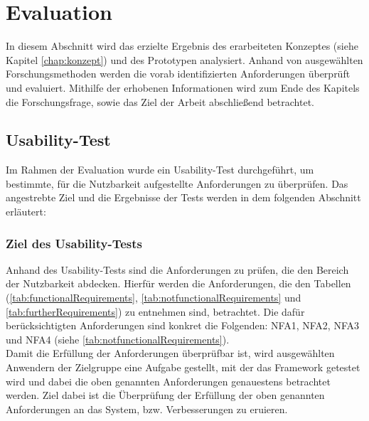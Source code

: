 \chapter{Evaluation}
\label{chap:evaluation}
In diesem Abschnitt wird das erzielte Ergebnis des erarbeiteten Konzeptes (siehe Kapitel \ref{chap:konzept}) und des 
Prototypen analysiert. Anhand von ausgewählten Forschungsmethoden werden die vorab identifizierten Anforderungen überprüft 
und evaluiert. Mithilfe der erhobenen Informationen wird zum Ende des Kapitels die Forschungsfrage, sowie das
Ziel der Arbeit abschließend betrachtet. 

\section{Usability-Test}
\label{sec:usabilitytest}
    Im Rahmen der Evaluation wurde ein Usability-Test durchgeführt, um bestimmte, für die Nutzbarkeit aufgestellte Anforderungen zu 
    überprüfen.
    Das angestrebte Ziel und die Ergebnisse der Tests werden in dem folgenden Abschnitt erläutert:
    
    \subsection{Ziel des Usability-Tests}
        Anhand des Usability-Tests sind die Anforderungen zu prüfen, die den Bereich der Nutzbarkeit abdecken. 
        Hierfür werden die Anforderungen, die den Tabellen (\ref{tab:functionalRequirements}, \ref{tab:notfunctionalRequirements} und \ref{tab:furtherRequirements}) 
        zu entnehmen sind, betrachtet. Die dafür berücksichtigten Anforderungen sind konkret die Folgenden: NFA1, NFA2, NFA3 und NFA4 (siehe \ref{tab:notfunctionalRequirements}).
        \\
        Damit die Erfüllung der Anforderungen überprüfbar ist, wird ausgewählten Anwendern der Zielgruppe %
        eine Aufgabe gestellt, mit der das Framework getestet wird und dabei die oben genannten Anforderungen genauestens betrachtet werden. 
        Ziel dabei ist die Überprüfung der Erfüllung der oben genannten Anforderungen an das System, bzw. Verbesserungen zu eruieren. 

